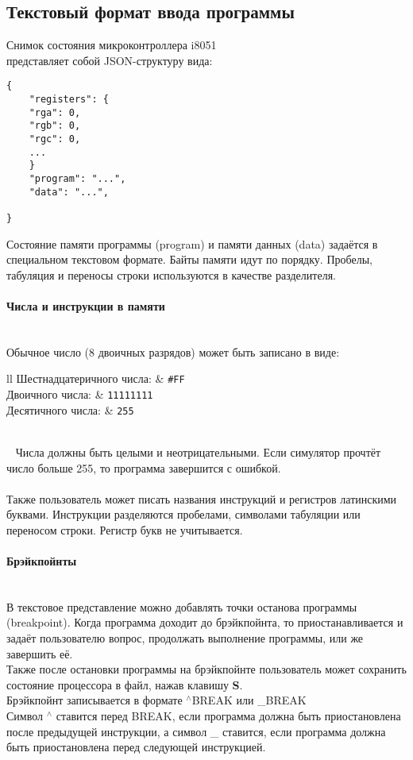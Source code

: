 \subsection{Текстовый формат ввода программы}
Снимок состояния микроконтроллера i8051 \\ представляет собой JSON-структуру вида:\\
\begin{lstlisting}
{
	"registers": {
	"rga": 0,
	"rgb": 0,
	"rgc": 0,
	...
	}
	"program": "...",
	"data": "...",
	
}
\end{lstlisting}
Состояние памяти программы (program) и памяти данных (data) задаётся в специальном текстовом формате.
Байты памяти идут по порядку. Пробелы, табуляция и переносы строки используются в качестве разделителя.

\paragraph{Числа и инструкции в памяти}~\\
Обычное число (8 двоичных разрядов) может быть записано в виде:
~
~\\[3mm]
\begin{tabular}{{l}{l}}
	Шестнадцатеричного числа: & {\tt\large \#FF} \\[2mm]
	Двоичного числа:          & {\tt\large 11111111} \\[2mm]
	Десятичного числа:        & {\tt\large *255} \\
\end{tabular} \\[3mm]
~
Числа должны быть целыми и неотрицательными. Если симулятор прочтёт число больше 255, то программа завершится с ошибкой.\\
~\\
Также пользователь может писать названия инструкций и регистров латинскими буквами. Инструкции разделяются пробелами, символами табуляции или переносом строки. Регистр букв не учитывается.\\

\paragraph{Брэйкпойнты}~\\
В текстовое представление можно добавлять точки останова программы (breakpoint). Когда программа доходит до брэйкпойнта, то приостанавливается и задаёт пользователю вопрос, продолжать выполнение программы, или же завершить её.\\
Также после остановки программы на брэйкпойнте пользователь может сохранить состояние процессора в файл, нажав клавишу \textbf{S}. \\
Брэйкпойнт записывается в формате $^\wedge$BREAK или \_BREAK \\
Символ $^\wedge$ ставится перед BREAK, если программа должна быть приостановлена после предыдущей инструкции, а символ \_ ставится, если программа должна быть приостановлена перед следующей инструкцией.

